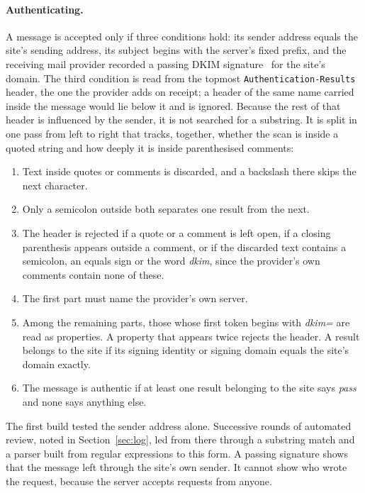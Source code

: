 \documentclass[sigconf,nonacm]{acmart}
\newcommand{\code}[1]{\textnormal{\texttt{\small #1}}}
\begin{document}
\paragraph{Authenticating.}
A message is accepted only if three conditions hold: its sender address equals the site's
sending address, its subject begins with the server's fixed prefix, and the receiving mail
provider recorded a passing DKIM signature~\cite{rfc6376} for the site's domain. The third
condition is read from the topmost \code{Authentication-Results} header, the one the provider
adds on receipt; a header of the same name carried inside the message would lie below it and
is ignored. Because the rest of that header is influenced by the sender, it is not searched
for a substring. It is split in one pass from left to right that tracks, together, whether the
scan is inside a quoted string and how deeply it is inside parenthesised comments:
\begin{enumerate}[leftmargin=*,itemsep=1pt,topsep=2pt]
  \item Text inside quotes or comments is discarded, and a backslash there skips the next
  character.
  \item Only a semicolon outside both separates one result from the next.
  \item The header is rejected if a quote or a comment is left open, if a closing parenthesis
  appears outside a comment, or if the discarded text contains a semicolon, an equals sign or
  the word \emph{dkim}, since the provider's own comments contain none of these.
  \item The first part must name the provider's own server.
  \item Among the remaining parts, those whose first token begins with \emph{dkim=} are read as
  properties. A property that appears twice rejects the header. A result belongs to the site if
  its signing identity or signing domain equals the site's domain exactly.
  \item The message is authentic if at least one result belonging to the site says \emph{pass}
  and none says anything else.
\end{enumerate}
The first build tested the sender address alone. Successive rounds of automated review, noted in
Section~\ref{sec:log}, led from there through a substring match and a parser built from
regular expressions to this form. A passing signature shows that the message left through the
site's own sender. It cannot show who wrote the request, because the server accepts requests
from anyone.
\end{document}
